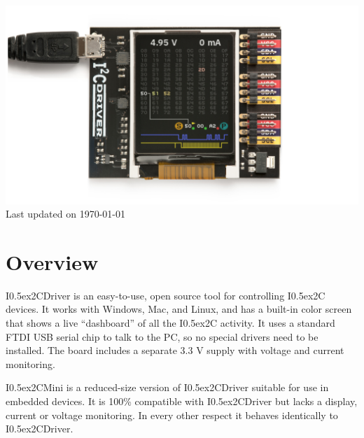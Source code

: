 \documentclass{article}
\newcommand{\two}{\raise0.5ex\hbox{\footnotesize{2}}}
\newcommand{\iic}{I\two{}C}
\newcommand{\iicdriver}{I\two{}CDriver}
\newcommand{\iicmini}{I\two{}CMini}
\begin{document}
\newpage
\begin{center}
\includegraphics[width=1.00\textwidth]{img/i2cdriver/i2cdriver-hero}
Last updated on \today
\end{center}
\tableofcontents

\newpage

\setlength{\parindent}{0mm}
\setlength{\parskip}{1mm}

\section{Overview}

\iicdriver{} is an easy-to-use, open source tool for controlling \iic{} devices.
It works with Windows, Mac, and Linux, and has a built-in color screen that shows a live “dashboard” of all the \iic{} activity.
It uses a standard FTDI USB serial chip to talk to the PC, so no special drivers need to be installed.
The board includes a separate 3.3 V supply with voltage and current monitoring.

\iicmini{} is a reduced-size version of \iicdriver{} suitable for use in embedded devices.
It is 100\% compatible with \iicdriver{} but lacks a display, current or voltage monitoring.
In every other respect it behaves identically to \iicdriver{}.
\end{document}
